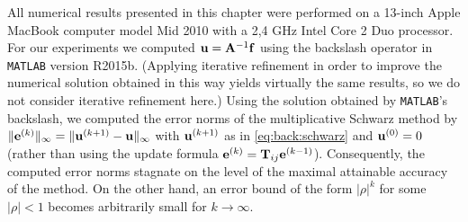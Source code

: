 All numerical results presented in this chapter were performed on a 13-inch
Apple MacBook computer model Mid 2010 with a 2,4 GHz Intel Core 2 Duo
processor. For our experiments we computed $\mathbf{u}=\mathbf{A}^{-1}\mathbf{f}$ using the backslash
operator in \texttt{MATLAB} version R2015b. (Applying iterative refinement in
order to improve the numerical solution obtained in this way yields virtually
the same results, so we do not consider iterative refinement here.) Using the
solution obtained by \texttt{MATLAB}'s backslash, we computed the error norms
of the multiplicative Schwarz method by
$\|\mathbf{e}^{(k)}\|_\infty=\|\mathbf{u}^{(k+1)}-\mathbf{u}\|_\infty$ with $\mathbf{u}^{(k+1)}$
as in \eqref{eq:back:schwarz} and $\mathbf{u}^{(0)}=0$ (rather than using the update
formula $\mathbf{e}^{(k)}=\mathbf{T}_{ij}\mathbf{e}^{(k-1)}$). Consequently, the computed error norms
stagnate on the level of the maximal attainable accuracy of the method.
On the other hand, an error bound of the form $|\rho|^k$ for some
$|\rho|<1$ becomes arbitrarily small for $k\rightarrow\infty$.


